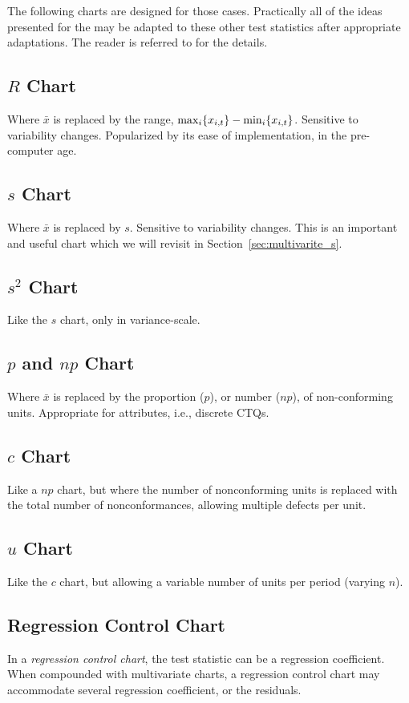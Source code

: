 The following charts are designed for those cases. 
Practically all of the ideas presented for the \barxChart may be adapted to these other test statistics after appropriate adaptations. 
The reader is referred to \cite{montgomery_introduction_2007} for the details. 

\label{sec:other_control_charts}
\subsection{$R$ Chart}
Where $\bar{x}$ is replaced by the range, $\max_i\{ x_{i,t} \}-\min_i\{ x_{i,t} \}$.
Sensitive to variability changes. 
Popularized by its ease of implementation, in the pre-computer age. 
\subsection{$s$ Chart}
Where $\bar{x}$ is replaced by $s$. 
Sensitive to variability changes. 
This is an important and useful chart which we will revisit in Section~\ref{sec:multivarite_s}.
\subsection{$s^2$ Chart}
Like the $s$ chart, only in variance-scale.
\subsection{$p$ and $np$ Chart}
Where $\bar{x}$ is replaced by the proportion ($p$), or number ($np$), of non-conforming units.
Appropriate for attributes, i.e., discrete CTQs.
\subsection{$c$ Chart}
Like a $np$ chart, but where the number of nonconforming units is replaced with the total number of nonconformances, allowing multiple defects per unit. 
\subsection{$u$ Chart}
Like the $c$ chart, but allowing a variable number of units per period (varying $n$).
\subsection{Regression Control Chart}
In a \emph{regression control chart}, the test statistic can be a regression coefficient. 
When compounded with multivariate charts, a regression control chart may accommodate several regression  coefficient, or the residuals. 









